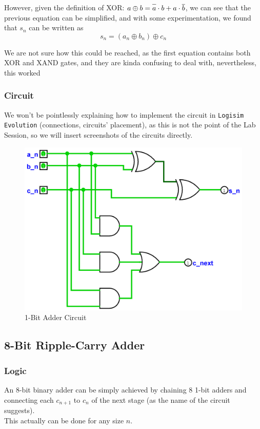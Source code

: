 \documentclass{article}
\begin{document}
However, given the definition of XOR:
$ a \oplus b = \overline{a \vphantom b} \cdot b + a \cdot \overline{b} $, we can see that the previous equation can be simplified, and with some experimentation, we found that $s_n$ can be written as
$$s_n = (a_n \oplus b_n) \oplus c_n$$


We are not sure how this could be reached, as the first equation contains both XOR and XAND gates, and they are kinda confusing to deal with, nevertheless, this worked 

\subsubsection{Circuit}
We won't be pointlessly explaining how to implement the circuit in \verb|Logisim Evolution| (connections, circuits' placement), as this is not the point of the Lab Session, so we will insert screenshots of the circuits directly.

\begin{figure}[H]
    \centering
    \includegraphics[width=.8\textwidth]{circuits/OneBitAdder.png}
    \caption{1-Bit Adder Circuit}
\end{figure}

\subsection{8-Bit Ripple-Carry Adder}

\subsubsection{Logic}
An 8-bit binary adder can be simply achieved by chaining 8 1-bit adders and connecting each $c_{n+1}$ to $c_n$ of the next stage (as the name of the circuit suggests). \\
This actually can be done for any size $n$.
\end{document}
